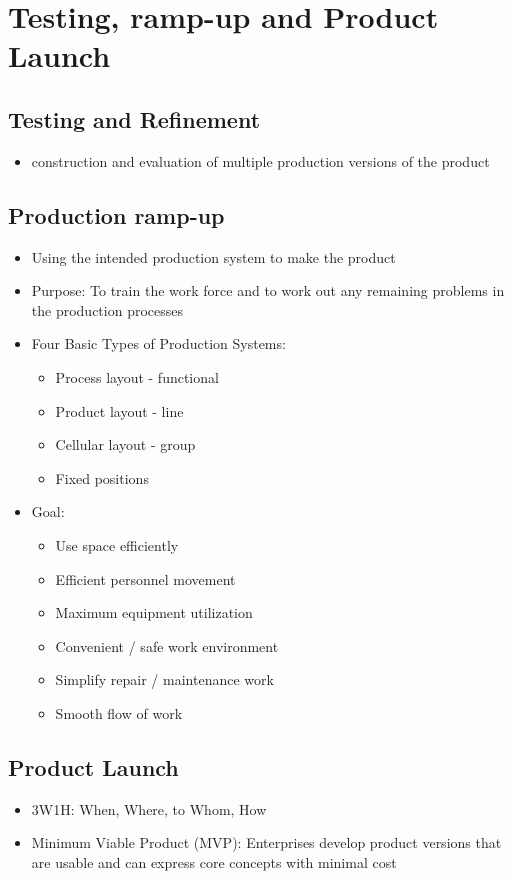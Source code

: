 \documentclass[openany,12pt,a4paper]{book}
\begin{document}
\chapter{Testing, ramp-up and Product Launch}
\section{Testing and Refinement}
\begin{itemize}
    \item construction and evaluation of multiple production versions of the product
\end{itemize}
\section{Production ramp-up}
\begin{itemize}
    \item Using the intended production system to make the product
    \item Purpose: To train the work force and to work out any remaining problems in the production processes
    \item Four Basic Types of Production Systems:
    \begin{itemize}
        \item Process layout - functional
        \item Product layout - line
        \item Cellular layout - group
        \item Fixed positions
    \end{itemize}
    \item Goal:
    \begin{itemize}
        \item Use space efficiently
        \item Efficient personnel movement
        \item Maximum equipment utilization
        \item Convenient / safe work environment
        \item Simplify repair / maintenance work
        \item Smooth flow of work
    \end{itemize}
\end{itemize}
\section{Product Launch}
\begin{itemize}
    \item 3W1H: When, Where, to Whom, How
    \item Minimum Viable Product (MVP): Enterprises develop product versions that are usable and can express core concepts with minimal cost
\end{itemize}
\end{document}
